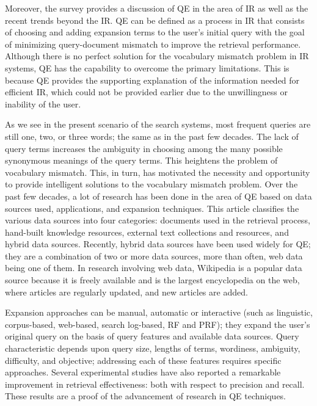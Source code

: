 Moreover, the survey provides a discussion of QE in the area of IR as well as the recent trends beyond the IR. QE can be defined as a process in IR that consists of choosing and adding expansion terms to the user's initial query with the goal of minimizing query-document mismatch to improve the retrieval performance. Although there is no perfect solution for the vocabulary mismatch problem in IR systems, QE has the capability to overcome the primary limitations. This is because QE provides the supporting explanation of the information needed for efficient IR, which could not be provided earlier due to the unwillingness or inability of the user. 

As we see in the present scenario of the search systems, most frequent queries are still one, two, or three words; the same as in the past few decades. The lack of query terms increases the ambiguity in choosing among the many possible synonymous meanings of the query terms. This heightens the problem of vocabulary mismatch. This, in turn, has motivated the necessity and opportunity to provide intelligent solutions to the vocabulary mismatch problem. Over the past few decades, a lot of research  has been done in the area of QE based on data sources used, applications, and expansion techniques. This article classifies the various data sources into four categories: documents used in the retrieval process, hand-built knowledge resources, external text collections and resources, and hybrid data sources. Recently, hybrid data sources have been used widely for QE; they are a combination of two or more data sources, more than often, web data being one of them. In research involving web data, Wikipedia is a popular data source because it is freely available and is the largest encyclopedia on the web, where articles are regularly updated, and new articles are added.

Expansion approaches can be manual, automatic or interactive (such as linguistic, corpus-based, web-based, search log-based, RF and PRF); they  expand the user's original query on the basis of  query features and available data sources. Query characteristic depends upon query size, lengths of terms, wordiness, ambiguity, difficulty, and objective; addressing each of these features requires specific approaches. Several experimental studies have also reported a remarkable improvement in  retrieval effectiveness: both with respect to precision and recall. These results are a proof of the advancement of research in QE techniques.


